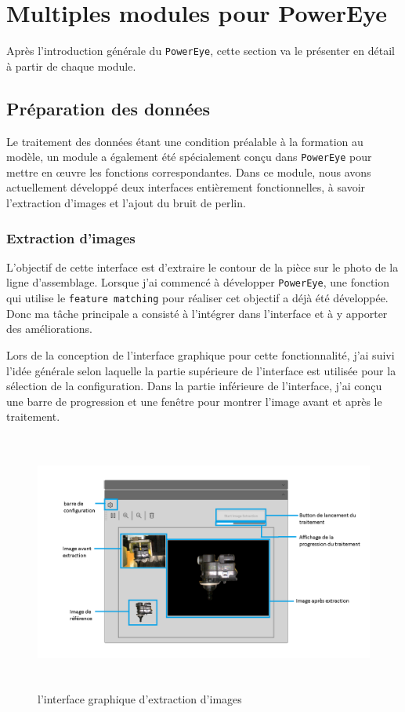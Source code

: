 \section{Multiples modules pour PowerEye}
Après l'introduction générale du \texttt{PowerEye}, cette section va le présenter en détail à partir de chaque module.

\subsection{Préparation des données}
Le traitement des données étant une condition préalable à la formation au modèle, un module a également été spécialement conçu dans \texttt{PowerEye} pour mettre en œuvre les fonctions correspondantes. Dans ce module, nous avons actuellement développé deux interfaces entièrement fonctionnelles, à savoir l'extraction d'images et l'ajout du bruit de perlin. 
\subsubsection{Extraction d'images}
L'objectif de cette interface est d'extraire le contour de la pièce sur le photo de la ligne d'assemblage. Lorsque j'ai commencé à développer \texttt{PowerEye}, une fonction qui utilise le \texttt{feature matching} pour réaliser cet objectif a déjà été développée. Donc ma tâche principale a consisté à l'intégrer dans l'interface et à y apporter des améliorations. 

Lors de la conception de l'interface graphique pour cette fonctionnalité, j'ai suivi l'idée générale selon laquelle la partie supérieure de l'interface est utilisée pour la sélection de la configuration. Dans la partie inférieure de l'interface, j'ai conçu une barre de progression et une fenêtre pour montrer l'image avant et après le traitement. 
\begin{figure}[H]
    \centering
    \includegraphics[height=8.5cm]{ressources/images/imageExtract.png}
    \caption{l'interface graphique d'extraction d'images}
\end{figure}

